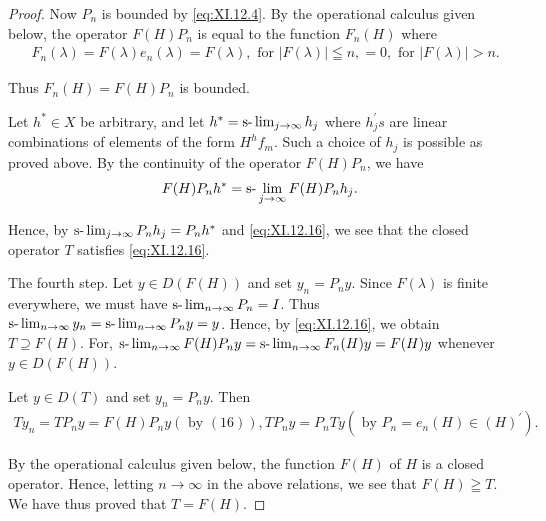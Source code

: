 \begin{proof}
Now $P_{n}$ is bounded by \eqref{eq:XI.12.4}. By the operational calculus given below, the operator $F(H)P_{n}$ is equal to the function $F_{n}(H)$ where 
\[
\begin{aligned}
&F _{n} (\lambda)  = F (\lambda) e _{n} (\lambda) = F (\lambda), \text{ for } | F (\lambda) | \leqq n, = 0, \text{ for } | F (\lambda) | > n.
\end{aligned}
\]

Thus $F_{n}(H) = F(H)P_{n}$ is bounded. 

Let $h^{*} \in X$ be arbitrary, and let $h^{*} = \text{s-}\lim\nolimits_{j \to \infty} h_{j}$ where $h_{j}^{\prime}s$ are linear combinations of elements of the form $H^{h}f_{m}$. Such a choice of $h_{j}$ is possible as proved above. By the continuity of the operator $F(H)P_{n}$, we have 
\[
F (H) P _{n} h ^{*} = \text{s-}\lim _{j \rightarrow \infty} F (H) P _{n} h _{j}.
\]

Hence, by $\text{s-}\lim\nolimits_{j \to \infty} P_n h_j = P_n h^*$ and \eqref{eq:XI.12.16}, we see that the closed operator $T$ satisfies \eqref{eq:XI.12.16}. 

The fourth step. Let $y \in D(F(H))$ and set $y_n = P_n y$. Since $F(\lambda)$ is finite everywhere, we must have $\text{s-}\lim\nolimits_{n \to \infty} P_n = I$. Thus $\text{s-}\lim\nolimits_{n \to \infty} y_n = \text{s-}\lim\nolimits_{n \to \infty} P_n y = y$. Hence, by \eqref{eq:XI.12.16}, we obtain $T \supseteq F(H)$. For, $\text{s-}\lim\nolimits_{n \to \infty} F(H) P_n y = \text{s-}\lim\nolimits_{n \to \infty} F_n(H) y = F(H) y$ whenever $y \in D(F(H))$. 

Let $y \in D(T)$ and set $y_{n} = P_{n}y$. Then 
\[
\begin{gathered}
T y _{n} = T P _{n} y = F (H) P _{n} y (\text{ by } (1 6)), T P _{n} y = P _{n} T y (\text{ by } P _{n} = e _{n} (H) \in (H) ^{\prime}).
\end{gathered}
\]

By the operational calculus given below, the function $F(H)$ of $H$ is a closed operator. Hence, letting $n \to \infty$ in the above relations, we see that $F(H) \geqq T$. We have thus proved that $T = F(H)$. 
\end{proof}


